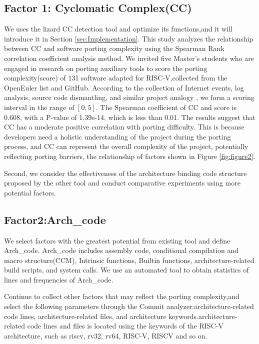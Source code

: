 \documentclass[sigconf,screen,review,anonymous]{acmart}
\begin{document}
\subsection{Factor 1: Cyclomatic Complex(CC)}
\label{sec:factor-1}
We uses the lizard CC detection tool and optimize its functions,and it will introduce it in Section \ref{sec:Implementation}.
This study analyzes the relationship between CC and software porting complexity using the Spearman Rank correlation coefficient analysis method.
We invited five Master's students who are engaged in research on porting auxiliary tools to score the porting complexity(score) of 131 software adapted for RISC-V,collected from the OpenEuler list\citep{stage2023} and GitHub.
According to the collection of Internet events, log analysis, source code dismantling, and similar project analogy \cite{liangguanyu2020}, we form a scoring interval in the range of $[0,5]$.
The Spearman coefficient of CC and score is 0.608, with a P-value of 1.39e-14, which is less than 0.01.
The results suggest that CC has a moderate positive correlation with porting difficulty.
This is because developers need a holistic understanding of the project during the porting process, and CC can represent the overall complexity of the project, potentially reflecting porting barriers, the relationship of factors shown in Figure \ref{fig:figure2}.




Second, we consider the effectiveness of the architecture binding code structure proposed by the other tool and conduct comparative experiments using more potential factors.
\subsection{Factor2:Arch\_code}

We select factors with the greatest potential from existing tool and define Arch\_code.
Arch\_code includes assembly code, conditional compilation and macro structure(CCM), Intrinsic functions, Builtin functions, architecture-related build scripts, and system calls.
We use an automated tool to obtain statistics of lines and frequencies of Arch\_code.

Continue to collect other factors that may reflect the porting complexity,and select the following parameters through the Commit analyzer:architecture-related code lines, architecture-related files, and architecture keywords.architecture-related code lines and files is located using the keywords of the RISC-V architecture, such as riscv, rv32, rv64, RISC-V, RISCV and so on.
\end{document}
